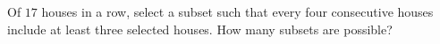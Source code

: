 Of $17$ houses in a row, select a subset such that every four consecutive houses include at least three selected houses. How many subsets are possible?
